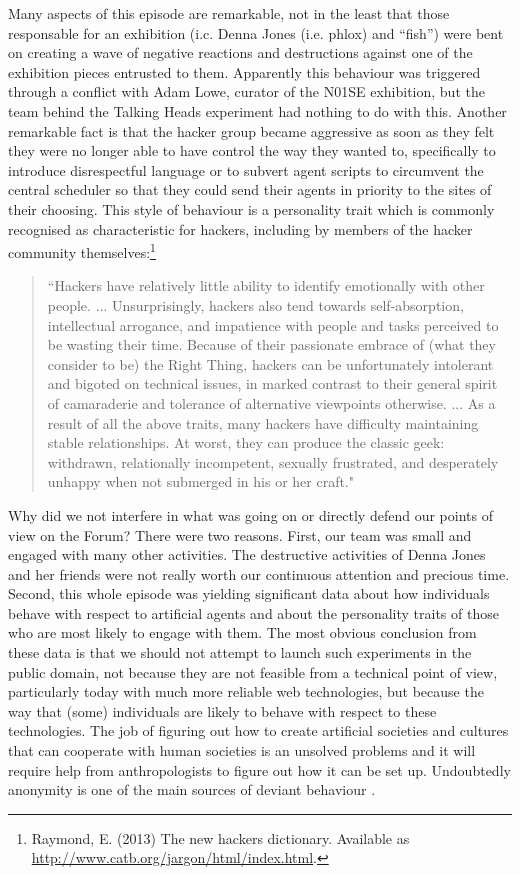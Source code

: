 Many aspects of this episode are remarkable, not in the least that those responsable for an 
exhibition (i.c. Denna Jones (i.e. phlox) and ``fish'') were bent on creating a wave of negative reactions and 
destructions against one of the exhibition pieces entrusted to them. Apparently this behaviour was triggered through
a conflict 
with Adam Lowe, curator of the N01SE exhibition, but the team behind the Talking Heads experiment had nothing to do 
with this. Another remarkable fact is that the hacker group 
became aggressive as soon as they felt they were no longer able to have control the way they wanted to, specifically 
to introduce disrespectful language or to subvert agent scripts to circumvent the central scheduler so that they 
could send their agents in priority to the sites of their choosing.
This style of behaviour is a personality trait which is commonly recognised as characteristic for 
hackers, including by members of the hacker community themselves:\footnote{
Raymond, E. (2013) The new hackers dictionary. Available as \url{ http://www.catb.org/jargon/html/index.html}.}

\begin{quotation}
``Hackers have relatively little ability to identify emotionally with other people. ... Unsurprisingly, hackers also tend towards self-absorption, intellectual arrogance, and impatience with people and tasks perceived to be wasting their time. Because of their passionate embrace of (what they consider to be) the Right Thing, hackers can be unfortunately intolerant and bigoted on technical issues, in marked contrast to their general spirit of camaraderie and tolerance of alternative viewpoints otherwise. ... As a result of all the above traits, many hackers have difficulty maintaining stable relationships. At worst, they can produce the classic geek: withdrawn, relationally incompetent, sexually frustrated, and desperately unhappy when not submerged in his or her craft."
\end{quotation}

Why did we not interfere in what was going on or directly defend our points of view on the Forum? There were two reasons. First, our team was small and engaged with many other activities. The destructive activities of Denna Jones and her friends were not really worth our continuous attention and precious time. Second, this whole episode was yielding significant data about how individuals behave with respect to artificial agents and about the personality traits of those who are most likely to engage with them. The most obvious conclusion from these data is that we should not attempt to launch such experiments in 
the public domain, not because they are not feasible from a technical point of view, particularly today with much more 
reliable web technologies, but because the way that (some) individuals are likely 
to behave with respect to these technologies. The job of figuring out how to create artificial societies and cultures 
that can cooperate with human societies is an unsolved problems and it will require help from anthropologists to figure out 
how it can be set up. Undoubtedly anonymity is one of the main sources of deviant behaviour \citep{Knight:1999}. 

